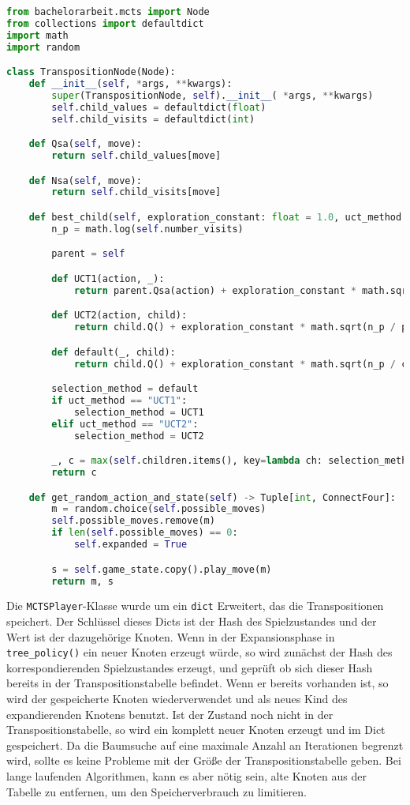 \begin{lstlisting}[language=Python,label={lst:transpos-node}]
from bachelorarbeit.mcts import Node
from collections import defaultdict
import math
import random

class TranspositionNode(Node):
    def __init__(self, *args, **kwargs):
        super(TranspositionNode, self).__init__( *args, **kwargs)
        self.child_values = defaultdict(float)
        self.child_visits = defaultdict(int)

    def Qsa(self, move):
        return self.child_values[move]

    def Nsa(self, move):
        return self.child_visits[move]

    def best_child(self, exploration_constant: float = 1.0, uct_method: str = "UCT") -> "Node":
        n_p = math.log(self.number_visits)

        parent = self

        def UCT1(action, _):
            return parent.Qsa(action) + exploration_constant * math.sqrt(n_p / parent.Nsa(action))

        def UCT2(action, child):
            return child.Q() + exploration_constant * math.sqrt(n_p / parent.Nsa(action))

        def default(_, child):
            return child.Q() + exploration_constant * math.sqrt(n_p / child.number_visits)

        selection_method = default
        if uct_method == "UCT1":
            selection_method = UCT1
        elif uct_method == "UCT2":
            selection_method = UCT2

        _, c = max(self.children.items(), key=lambda ch: selection_method(*ch))
        return c

    def get_random_action_and_state(self) -> Tuple[int, ConnectFour]:
        m = random.choice(self.possible_moves)
        self.possible_moves.remove(m)
        if len(self.possible_moves) == 0:
            self.expanded = True

        s = self.game_state.copy().play_move(m)
        return m, s
\end{lstlisting}

Die \verb|MCTSPlayer|-Klasse wurde um ein \verb|dict| Erweitert, das die Transpositionen speichert.
Der Schlüssel dieses Dicts ist der Hash des Spielzustandes und der Wert ist der dazugehörige Knoten.
Wenn in der Expansionsphase in \verb|tree_policy()| ein neuer Knoten erzeugt würde, so wird zunächst der Hash des korrespondierenden Spielzustandes erzeugt, und geprüft ob sich dieser Hash bereits in der Transpositionstabelle befindet.
Wenn er bereits vorhanden ist, so wird der gespeicherte Knoten wiederverwendet und als neues Kind des expandierenden Knotens benutzt.
Ist der Zustand noch nicht in der Transpositionstabelle, so wird ein komplett neuer Knoten erzeugt und im Dict gespeichert.
Da die Baumsuche auf eine maximale Anzahl an Iterationen begrenzt wird, sollte es keine Probleme mit der Größe der Transpositionstabelle geben.
Bei lange laufenden Algorithmen, kann es aber nötig sein, alte Knoten aus der Tabelle zu entfernen, um den Speicherverbrauch zu limitieren.

